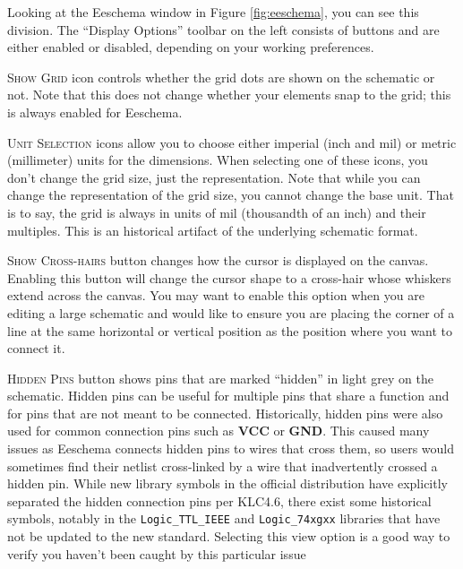 Looking at the Eeschema window in Figure \ref{fig:eeschema}, you can see this division.
The ``Display Options'' toolbar on the left consists of buttons and are either enabled or disabled, depending on your working preferences.

\newpage
{}\textsc{Show Grid} icon controls whether the grid dots are shown on the schematic or not.
Note that this does not change whether your elements snap to the grid; this is always enabled for Eeschema.

\textsc{Unit Selection} icons allow you to choose either imperial (inch and mil) or metric (millimeter) units for the dimensions.  
When selecting one of these icons, you don't change the grid size, just the representation.
Note that while you can change the representation of the grid size, you cannot change the base unit.
That is to say, the grid is always in units of mil (thousandth of an inch) and their multiples.
This is an historical artifact of the underlying schematic format.

\textsc{Show Cross-hairs} button changes how the cursor is displayed on the canvas.
Enabling this button will change the cursor shape to a cross-hair whose whiskers extend across the canvas.
You may want to enable this option when you are editing a large schematic and would like to ensure you are placing the corner of a line at the same horizontal or vertical position as the position where you want to connect it.

\textsc{Hidden Pins} button shows pins that are marked ``hidden'' in light grey on the schematic.
Hidden pins can be useful for multiple pins that share a function and for pins that are not meant to be connected.
Historically, hidden pins were also used for common connection pins such as \textbf{VCC} or \textbf{GND}.
This caused many issues as Eeschema connects hidden pins to wires that cross them, so users would sometimes find their netlist cross-linked by a wire that inadvertently crossed a hidden pin.
While new library symbols in the official distribution have explicitly separated the hidden connection pins per KLC4.6, there exist some historical symbols, notably in the \texttt{Logic\_TTL\_IEEE} and \texttt{Logic\_74xgxx} libraries that have not be updated to the new standard.
Selecting this view option is a good way to verify you haven't been caught by this particular issue

